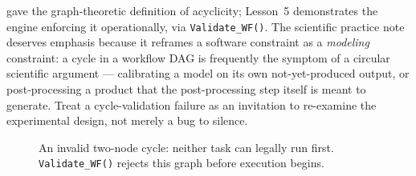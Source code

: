  gave the graph-theoretic definition of acyclicity;
Lesson~5 demonstrates the engine enforcing it operationally, via
\texttt{Validate\_WF()}. The scientific practice note deserves emphasis
because it reframes a software constraint as a \emph{modeling} constraint: a
cycle in a workflow DAG is frequently the symptom of a circular scientific
argument --- calibrating a model on its own not-yet-produced output, or
post-processing a product that the post-processing step itself is meant to
generate. Treat a cycle-validation failure as an invitation to re-examine the
experimental design, not merely a bug to silence.

\begin{figure}[h]
\centering
{}
\caption{An invalid two-node cycle: neither task can legally run first.
\texttt{Validate\_WF()} rejects this graph before execution begins.}
\label{fig:cycle}
\end{figure}

